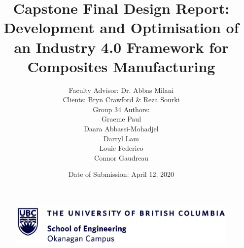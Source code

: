 \documentclass{article}
\begin{document}
\begin{figure}
\vspace{-2cm}
\hspace{-2cm}
\includegraphics[width=\linewidth]{ubc_logo_ENG.eps}
\end{figure}

\linespread{1.3}\selectfont

\title{\bfseries{Capstone Final Design Report:\\Development and Optimisation of an Industry 4.0 Framework for Composites Manufacturing} \vspace{1cm}} 

\author{
\LARGE Faculty Advisor: Dr. Abbas Milani \\
\LARGE Clients: Bryn Crawford \& Reza Sourki \vspace{3cm}\\ 
\Large Group 34 Authors: \\ 
\Large Graeme Paul\\ 
\Large Daara Abbassi-Mohadjel\\
\Large Darryl Lam\\
\Large Louie Federico\\
\Large Connor Gaudreau\\ 
}

\date{\vspace{5cm} \Large Date of Submission: April 12, 2020} 

\maketitle
\thispagestyle{empty}
\newpage

\tableofcontents
\clearpage

\begingroup
\linespread{1.3}\selectfont
\listoffigures
{}
\endgroup
\clearpage

\setlength{\parskip}{1em}
\setlength{\parindent}{0pt}

\linespread{1.3}\selectfont


\end{document}
